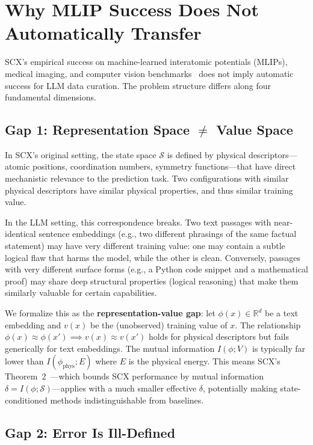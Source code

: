 \documentclass[11pt,twocolumn]{article}
\newcommand{\R}{\mathbb{R}}
\begin{document}
\section{Why MLIP Success Does Not Automatically Transfer}

SCX's empirical success on machine-learned interatomic potentials (MLIPs), medical imaging, and computer vision benchmarks~\cite{scx2026} does not imply automatic success for LLM data curation. The problem structure differs along four fundamental dimensions.

\subsection{Gap 1: Representation Space $\neq$ Value Space}

In SCX's original setting, the state space $\mathcal{S}$ is defined by physical descriptors---atomic positions, coordination numbers, symmetry functions---that have direct mechanistic relevance to the prediction task. Two configurations with similar physical descriptors have similar physical properties, and thus similar training value.

In the LLM setting, this correspondence breaks. Two text passages with near-identical sentence embeddings (e.g., two different phrasings of the same factual statement) may have very different training value: one may contain a subtle logical flaw that harms the model, while the other is clean. Conversely, passages with very different surface forms (e.g., a Python code snippet and a mathematical proof) may share deep structural properties (logical reasoning) that make them similarly valuable for certain capabilities.

We formalize this as the \textbf{representation-value gap}: let $\phi(x) \in \R^d$ be a text embedding and $v(x)$ be the (unobserved) training value of $x$. The relationship $\phi(x) \approx \phi(x') \implies v(x) \approx v(x')$ holds for physical descriptors but fails generically for text embeddings. The mutual information $I(\phi; V)$ is typically far lower than $I(\phi_{\text{phys}}; E)$ where $E$ is the physical energy. This means SCX's Theorem~2~\cite{scx2026}---which bounds SCX performance by mutual information $\delta = I(\phi; \mathcal{S})$---applies with a much smaller effective $\delta$, potentially making state-conditioned methods indistinguishable from baselines.

\subsection{Gap 2: Error Is Ill-Defined}
\end{document}
